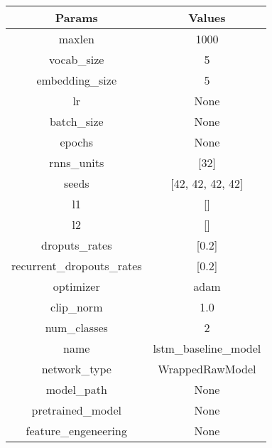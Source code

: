 \begin{table}[]
\begin{tabular}{|c|c|}
\hline
\textbf{Params} & \textbf{Values}\\\hline
maxlen & 1000 \\ \hline
vocab\_size & 5 \\ \hline
embedding\_size & 5 \\ \hline
lr & None \\ \hline
batch\_size & None \\ \hline
epochs & None \\ \hline
rnns\_units & [32] \\ \hline
seeds & [42, 42, 42, 42] \\ \hline
l1 & [] \\ \hline
l2 & [] \\ \hline
droputs\_rates & [0.2] \\ \hline
recurrent\_dropouts\_rates & [0.2] \\ \hline
optimizer & adam \\ \hline
clip\_norm & 1.0 \\ \hline
num\_classes & 2 \\ \hline
name & lstm\_baseline\_model \\ \hline
network\_type & WrappedRawModel \\ \hline
model\_path & None \\ \hline
pretrained\_model & None \\ \hline
feature\_engeneering & None \\ \hline
\end{tabular}
\end{table}
